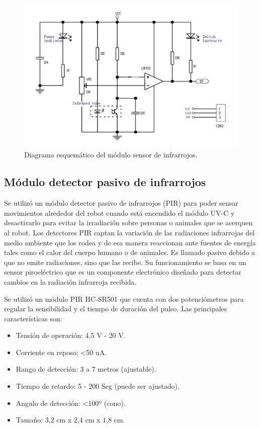 \begin{figure}[h]
	\centering
	\includegraphics[width=14cm]{./Figures/IRschem.jpg}
	\caption{Diagrama esquemático del módulo sensor de infrarrojos\protect\footnotemark.}
	\label{fig:IRschem}
\end{figure}




\subsection{Módulo detector pasivo de infrarrojos}

Se utilizó un módulo detector pasivo de infrarrojos (PIR) para poder sensar movimientos alrededor del robot cuando está encendido el módulo UV-C y desactivarlo para evitar la irradiación sobre personas o animales que se acerquen al robot. 
Los detectores PIR captan la variación de las radiaciones infrarrojas del medio ambiente que los rodea y de esa manera reaccionan ante fuentes de energía tales como el calor del cuerpo humano o de animales. Es llamado pasivo debido a que no emite radiaciones, sino que las recibe. Su funcionamiento se basa en un sensor piroeléctrico que es un componente electrónico diseñado para detectar cambios en la radiación infrarroja recibida. 

Se utilizó un módulo PIR HC-SR501 \citep{PIR} que cuenta con dos potenciómetros para regular la sensibilidad y el tiempo de duración del pulso. Las principales características son:

\begin{itemize}
	\item Tensión de operación: 4,5 V - 20 V.
	\item Corriente en reposo: <50 uA.
	\item Rango de detección: 3 a 7 metros (ajustable).
	\item Tiempo de retardo: 5 - 200 Seg (puede ser ajustado).
	\item Angulo de detección: <100º (cono).
	\item Tamaño: 3,2 cm x 2,4 cm x 1,8 cm.
\end{itemize}

